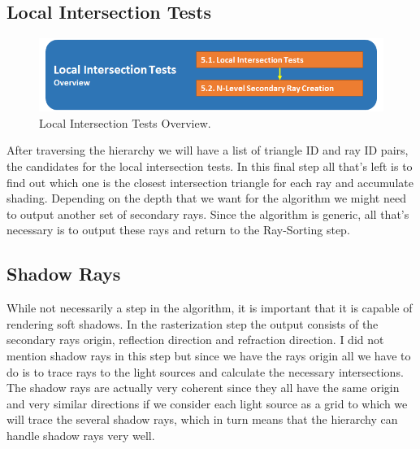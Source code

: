 \documentclass{llncs}
\begin{document}
%
\subsection{Local Intersection Tests}
%

\begin{figure}
\centering
\includegraphics[scale=0.60]{images/figure 6.png}
\caption{Local Intersection Tests Overview.}
\end{figure}

After traversing the hierarchy we will have a list of triangle ID and ray ID pairs, the candidates for the local intersection tests. In this final step all that's left is to find out which one is the closest intersection triangle for each ray and accumulate shading. Depending on the depth that we want for the algorithm we might need to output another set of secondary rays. Since the algorithm is generic, all that's necessary is to output these rays and return to the Ray-Sorting step.

%
\subsection{Shadow Rays}
%

While not necessarily a step in the algorithm, it is important that it is capable of rendering soft shadows. In the rasterization step the output consists of the secondary rays origin, reflection direction and refraction direction. I did not mention shadow rays in this step but since we have the rays origin all we have to do is to trace rays to the light sources and calculate the necessary intersections. The shadow rays are actually very coherent since they all have the same origin and very similar directions if we consider each light source as a grid to which we will trace the several shadow rays, which in turn means that the hierarchy can handle shadow rays very well.
\end{document}

